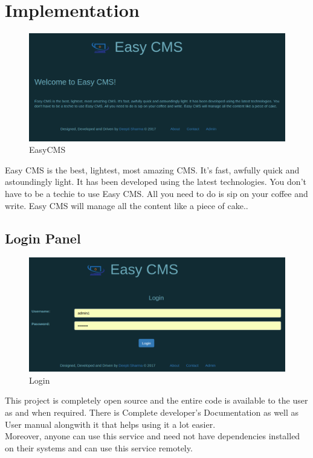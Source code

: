 
\section{ Implementation}
\begin{figure}[ht]
	\centering \includegraphics[scale=.45]{input/images/easy1.png}
	\caption{EasyCMS}
\end{figure}

 Easy CMS is the best, lightest, most amazing CMS. It's fast, awfully quick and astoundingly light. It has been developed using the latest technologies. You don't have to be a techie to use Easy CMS. All you need to do is sip on your coffee and write. Easy CMS will manage all the content like a piece of cake..\\
 

 \subsection{Login Panel}

 \begin{figure}[h!]
	\centering \includegraphics[scale=.45]{input/images/easy2.png}
	\caption{Login}
\end{figure}
This project is completely open source and the entire code is available 
to the user as and when required. There is Complete developer's 
Documentation as well as User manual alongwith it that helps using it a lot easier.\\
Moreover, anyone can use this service and need not have dependencies installed on their systems and can use this service remotely.\\\\

